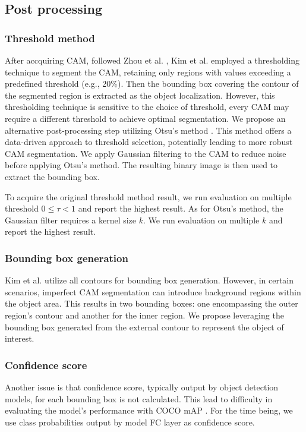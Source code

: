 \documentclass[conference]{IEEEtran}
\begin{document}
\subsection{Post processing}
\subsubsection{Threshold method}
After accquiring CAM, followed Zhou et al. \cite{zhou2015cnnlocalization}, Kim et al. employed a thresholding technique to segment the CAM, retaining only regions with values exceeding a predefined threshold (e.g., 20\%). Then the bounding box covering the contour of the segmented region is extracted as the object localization. However, this thresholding technique is sensitive to the choice of threshold, every CAM may require a different threshold to achieve optimal segmentation. We propose an alternative post-processing step utilizing Otsu's method \cite{otsu}. This method offers a data-driven approach to threshold selection, potentially leading to more robust CAM segmentation. We apply Gaussian filtering to the CAM to reduce noise before applying Otsu's method. The resulting binary image is then used to extract the bounding box.

To acquire the original threshold method \cite{zhou2015cnnlocalization} result, we run evaluation on multiple threshold $0 \leq \tau < 1$ and report the highest result. As for Otsu's method, the Gaussian filter requires a kernel size $k$. We run evaluation on multiple $k$ and report the highest result.



\subsubsection{Bounding box generation}
Kim et al. \cite{kim2022bridging} utilize all contours for bounding box generation. However, in certain scenarios, imperfect CAM segmentation can introduce background regions within the object area. This results in two bounding boxes: one encompassing the outer region's contour and another for the inner region. We propose leveraging the bounding box generated from the external contour to represent the object of interest.

\subsubsection{Confidence score}
Another issue is that confidence score, typically output by object detection models, for each bounding box is not calculated. This lead to difficulty in evaluating the model's performance with COCO mAP \cite{lin2015microsoft}. For the time being, we use class probabilities output by model FC layer as confidence score.
\end{document}
